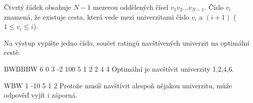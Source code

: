 Čtvrtý řádek obsahuje $N-1$ mezerou oddělených čísel $v_1 v_2 \ldots v_{N-1}$.
Číslo $v_i$ znamená, že existuje cesta, která vede mezi univerzitami číslo $v_i$ a $(i+1)$ ($1 \leq v_i \leq i$).



Na výstup vypište jedno číslo, součet ratingů navštívených univerzit na optimální cestě.



BWBBBW
6 0 3 -2 100 5
1 2 2 4 4
\sampleCOMMENT
Optimální je navštívit univerzity 1,2,4,6.
\sampleEND

\bigskip

WBW
1 -10 5
1 2
\sampleCOMMENT
Protože musíš navštívit alespoň nějakou univerzitu, může odpověď vyjít i záporná.
\sampleEND


